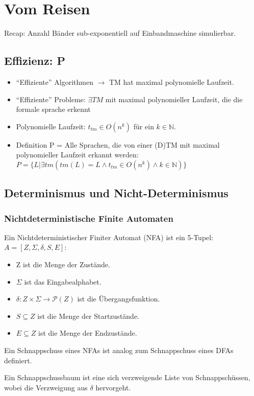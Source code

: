 \chapter{Vom Reisen}\label{complex}
Recap: Anzahl Bänder sub-exponentiell auf Einbandmaschine simulierbar.
\section{Effizienz: P}
\begin{itemize}
    \item ``Effiziente'' Algorithmen $\rightarrow$ TM hat maximal polynomielle Laufzeit.
    \item ``Effiziente'' Probleme: $\exists TM$ mit maximal polynomieller Laufzeit,
        die die formale sprache erkennt 
    \item Polynomielle Laufzeit: $t_{tm} \in O(n^k)$ für ein $k \in \mathbb{N}$.
    \item Definition P = Alle Sprachen,
        die von einer (D)TM mit maximal polynomieller Laufzeit erkannt werden:
        $P = \{L| \exists tm (tm(L) = L \wedge t_{tm} \in O(n^k) \wedge k \in \mathbb{N})\}$
\end{itemize}
\section{Determinismus und Nicht-Determinismus}
\subsection{Nichtdeterministische Finite Automaten}
Ein Nichtdeterministischer Finiter Automat (NFA) ist ein 5-Tupel:
$A = [Z, \Sigma, \delta, S, E]$:
\begin{itemize}
    \item Z ist die Menge der Zustände.
    \item $\Sigma$ ist das Eingabealphabet.
    \item $\delta: Z \times \Sigma \rightarrow \mathcal{P}(Z)$ ist die Übergangsfunktion.
    \item $S \subseteq Z$ ist die Menge der Startzustände.
    \item $E \subseteq Z$ ist die Menge der Endzustände.
\end{itemize}

Ein Schnappschuss eines NFAs ist analog zum Schnappschuss eines DFAs definiert.

Ein Schnappschussbaum ist eine sich verzweigende Liste von Schnappschüssen,
wobei die Verzweigung aus $\delta$ hervorgeht.

